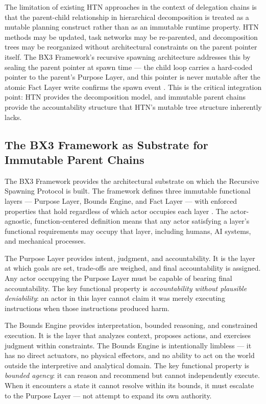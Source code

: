 The limitation of existing HTN approaches in the context of delegation chains is that the parent-child relationship in hierarchical decomposition is treated as a mutable planning construct rather than as an immutable runtime property. HTN methods may be updated, task networks may be re-parented, and decomposition trees may be reorganized without architectural constraints on the parent pointer itself. The BX3 Framework's recursive spawning architecture addresses this by sealing the parent pointer at spawn time — the child loop carries a hard-coded pointer to the parent's Purpose Layer, and this pointer is never mutable after the atomic Fact Layer write confirms the spawn event \cite{bx3whitepaper2026}. This is the critical integration point: HTN provides the decomposition model, and immutable parent chains provide the accountability structure that HTN's mutable tree structure inherently lacks.

\subsection{The BX3 Framework as Substrate for Immutable Parent Chains}
\label{sec:bx3-substrate}

The BX3 Framework provides the architectural substrate on which the Recursive Spawning Protocol is built. The framework defines three immutable functional layers — Purpose Layer, Bounds Engine, and Fact Layer — with enforced properties that hold regardless of which actor occupies each layer \cite{bx3whitepaper2026}. The actor-agnostic, function-centered definition means that any actor satisfying a layer's functional requirements may occupy that layer, including humans, AI systems, and mechanical processes.

The Purpose Layer provides intent, judgment, and accountability. It is the layer at which goals are set, trade-offs are weighed, and final accountability is assigned. Any actor occupying the Purpose Layer must be capable of bearing final accountability. The key functional property is \emph{accountability without plausible deniability}: an actor in this layer cannot claim it was merely executing instructions when those instructions produced harm.

The Bounds Engine provides interpretation, bounded reasoning, and constrained execution. It is the layer that analyzes context, proposes actions, and exercises judgment within constraints. The Bounds Engine is intentionally limbless — it has no direct actuators, no physical effectors, and no ability to act on the world outside the interpretive and analytical domain. The key functional property is \emph{bounded agency}: it can reason and recommend but cannot independently execute. When it encounters a state it cannot resolve within its bounds, it must escalate to the Purpose Layer — not attempt to expand its own authority.

